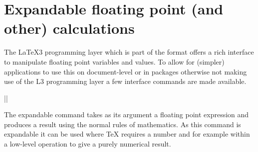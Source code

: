 \documentclass{ltxguide}
\begin{document}
\section{Expandable floating point (and other) calculations}

The \LaTeX3 programming layer which is part of the format offers a
rich interface to manipulate floating point variables and values. To
allow for (simpler) applications to use this on document-level or in
packages otherwise not making use of the L3 programming layer a few
interface commands are made available.


\begin{decl}
  |\fpeval| 
\end{decl}

The expandable command  takes as its argument a floating
point expression and produces a result using the normal rules of
mathematics. As this command is expandable it can be used where \TeX{}
requires a number and for example within a low-level  operation
to give a purely numerical result.
\end{document}
